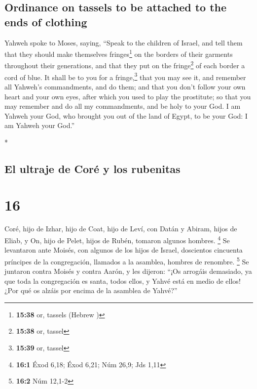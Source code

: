 \begin{paracol}{2}
\begin{otherlanguage}{english}
\hypertarget{ordinance-on-tassels-to-be-attached-to-the-ends-of-clothing}{%
\subsection{Ordinance on tassels to be attached to the ends of
clothing}\label{ordinance-on-tassels-to-be-attached-to-the-ends-of-clothing}}

 Yahweh spoke to Moses, saying,  ``Speak
to the children of Israel, and tell them that they should make
themselves fringes\footnote{\textbf{15:38} or, tassels (Hebrew
  )} on the borders of their garments throughout their
generations, and that they put on the fringe\footnote{\textbf{15:38} or,
  tassel} of each border a cord of blue.  It shall be to
you for a fringe,\footnote{\textbf{15:39} or, tassel} that you may see
it, and remember all Yahweh's commandments, and do them; and that you
don't follow your own heart and your own eyes, after which you used to
play the prostitute;  so that you may remember and do all
my commandments, and be holy to your God.  I am Yahweh
your God, who brought you out of the land of Egypt, to be your God: I am
Yahweh your God.''

\end{otherlanguage}

\switchcolumn[0]*

\hypertarget{el-ultraje-de-coruxe9-y-los-rubenitas}{%
\subsection{El ultraje de Coré y los
rubenitas}\label{el-ultraje-de-coruxe9-y-los-rubenitas}}

\hypertarget{section-30}{%
\section{16}\label{section-30}}

 Coré, hijo de Izhar, hijo de Coat, hijo de Leví, con
Datán y Abiram, hijos de Eliab, y On, hijo de Pelet, hijos de Rubén,
tomaron algunos hombres. \footnote{\textbf{16:1} Éxod 6,18; Éxod 6,21;
  Núm 26,9; Jds 1,11}  Se levantaron ante Moisés, con
algunos de los hijos de Israel, doscientos cincuenta príncipes de la
congregación, llamados a la asamblea, hombres de renombre. \footnote{\textbf{16:2}
  Núm 12,1-2}  Se juntaron contra Moisés y contra Aarón, y
les dijeron: ``¡Os arrogáis demasiado, ya que toda la congregación es
santa, todos ellos, y Yahvé está en medio de ellos! ¿Por qué os alzáis
por encima de la asamblea de Yahvé?''


\end{paracol}
